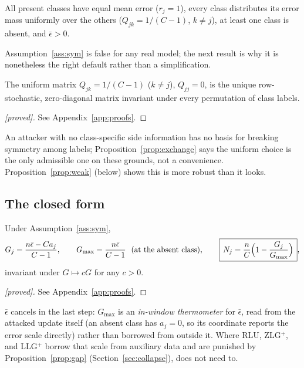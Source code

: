 \begin{assumption}
\label{ass:sym}
All present classes have equal mean error ($r_j=1$), every class
distributes its error mass uniformly over the others
($Q_{jk}=1/(C-1)$, $k\ne j$), at least one class is absent, and
$\bar\epsilon>0$.
\end{assumption}

Assumption~\ref{ass:sym} is false for any real model; the next result is
why it is nonetheless the right default rather than a simplification.

\begin{proposition}
\label{prop:exchange}
The uniform matrix $Q_{jk}=1/(C-1)$ ($k\ne j$), $Q_{jj}=0$, is the unique
row-stochastic, zero-diagonal matrix invariant under every permutation of
class labels.
\end{proposition}

\begin{proof}[\textnormal{[proved]}]
See Appendix~\ref{app:proofs}.
\end{proof}

An attacker with no class-specific side information has no basis for
breaking symmetry among labels; Proposition~\ref{prop:exchange} says the
uniform choice is the only admissible one on these grounds, not a
convenience. Proposition~\ref{prop:weak} (below) shows this is more
robust than it looks.

\subsection{The closed form}

\begin{theorem}
\label{thm:closed}
Under Assumption~\ref{ass:sym},
\[
 G_j = \frac{n\bar\epsilon - Ca_j}{C-1}, \qquad
 G_{\max} = \frac{n\bar\epsilon}{C-1} \ \ (\text{at the absent class}),
 \qquad
 \boxed{\,N_j = \frac{n}{C}\Bigl(1-\frac{G_j}{G_{\max}}\Bigr)\,} ,
\]
invariant under $G \mapsto cG$ for any $c>0$.
\end{theorem}

\begin{proof}[\textnormal{[proved]}]
See Appendix~\ref{app:proofs}.
\end{proof}

$\bar\epsilon$ cancels in the last step: $G_{\max}$ is an
\emph{in-window thermometer} for $\bar\epsilon$, read from the attacked
update itself (an absent class has $a_j=0$, so its coordinate reports the
error scale directly) rather than borrowed from outside it. Where RLU,
ZLG$^+$, and LLG$^+$ borrow that scale from auxiliary data and are
punished by Proposition~\ref{prop:gap} (Section~\ref{sec:collapse}),
\ourmethod{} does not need to.

